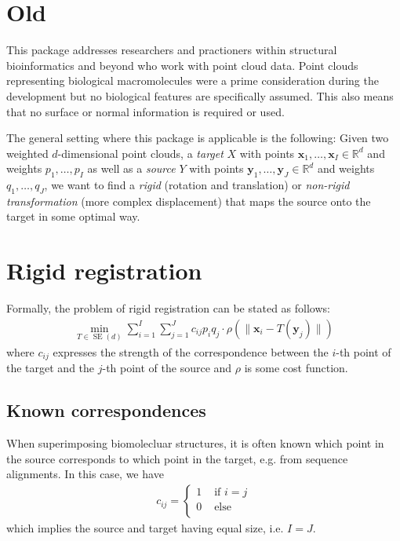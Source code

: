 

\section{Old}
This package addresses researchers and practioners within structural
bioinformatics and beyond who work with point cloud data.
Point clouds representing biological macromolecules were a prime consideration
during the development but no biological features are specifically assumed.
This also means that no surface or normal information is required or used.

The general setting where this package is applicable is the following:
Given two weighted $d$-dimensional point clouds,
a \emph{target} $X$ with points $\bm{x}_1, \dots, \bm{x}_I \in \mathbb{R}^d$
and weights $p_1, \dots, p_I$
as well as
a \emph{source} $Y$ with points $\bm{y}_1, \dots, \bm{y}_J \in \mathbb{R}^d$
and weights $q_1, \dots, q_J$,
we want to find a \emph{rigid} (rotation and translation) or \emph{non-rigid
transformation} (more complex displacement) that maps the source onto the target
in some optimal way.


\section{Rigid registration}

Formally, the problem of rigid registration can be stated as follows:
\begin{align*}
  \min_{T \in \operatorname{SE}(d)}
  \sum_{i = 1}^I
  \sum_{j = 1}^J
  c_{i j}
  p_i q_j
  \cdot
  \rho\left(
  \lVert
  \bm{x}_i - T(\bm{y}_j)
  \rVert
  \right)
\end{align*}
where $c_{i j}$ expresses the strength of the correspondence between the $i$-th
point of the target and the $j$-th point of the source and $\rho$ is some cost
function.

\subsection{Known correspondences}
When superimposing biomolecluar structures, it is often known which point in the
source corresponds to which point in the target, e.g. from sequence alignments.
In this case, we have
\begin{align*}
c_{i j} = \begin{cases}
  1 & \text{ if } i = j \\
  0 & \text{ else } \\
\end{cases}
\end{align*}
which implies the source and target having equal size, i.e. $I = J$.

